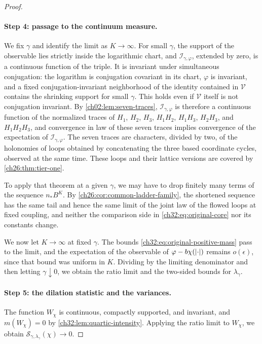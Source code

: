\begin{proof}
\paragraph{Step 4: passage to the continuum measure.}
We fix $\gamma$ and identify the limit as $K\to\infty$. For small $\gamma$, the support of the observable lies strictly inside the logarithmic chart, and $\mathcal I_{\gamma,\varphi}$, extended by zero, is a continuous function of the triple. It is invariant under simultaneous conjugation: the logarithm is conjugation covariant in its chart, $\varphi$ is invariant, and a fixed conjugation-invariant neighborhood of the identity contained in $\mathcal V$ contains the shrinking support for small $\gamma$. This holds even if $\mathcal V$ itself is not conjugation invariant. By \cref{ch02:lem:seven-traces}, $\mathcal I_{\gamma,\varphi}$ is therefore a continuous function of the normalized traces of $H_1$, $H_2$, $H_3$, $H_1H_2$, $H_1H_3$, $H_2H_3$, and $H_1H_2H_3$, and convergence in law of these seven traces implies convergence of the expectation of $\mathcal I_{\gamma,\varphi}$. The seven traces are characters, divided by two, of the holonomies of loops obtained by concatenating the three based coordinate cycles, observed at the same time. These loops and their lattice versions are covered by \cref{ch26:thm:tier-one}.

To apply that theorem at a given $\gamma$, we may have to drop finitely many terms of the sequence $n_*B^K$. By \cref{ch26:cor:common-ladder-family}, the shortened sequence has the same tail and hence the same limit of the joint law of the flowed loops at fixed coupling, and neither the comparison side in \eqref{ch32:eq:original-core} nor its constants change.

We now let $K\to\infty$ at fixed $\gamma$. The bounds \eqref{ch32:eq:original-positive-mass} pass to the limit, and the expectation of the observable of $\varphi-b\chi(\lvert \cdot\rvert)$ remains $o(\epsilon)$, since that bound was uniform in $K$. Dividing by the limiting denominator and then letting $\gamma\downarrow0$, we obtain the ratio limit and the two-sided bounds for $\lambda_\gamma$.

\paragraph{Step 5: the dilation statistic and the variances.}
The function $W_\chi$ is continuous, compactly supported, and invariant, and $m(W_\chi)=0$ by \cref{ch32:lem:quartic-intensity}. Applying the ratio limit to $W_\chi$, we obtain $\mathcal S_{\gamma,\lambda_\gamma}(\chi)\to0$.


\end{proof}
